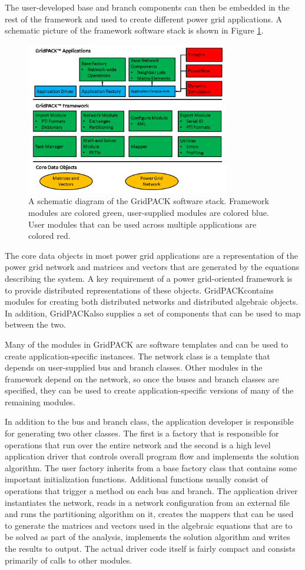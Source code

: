 \documentclass[preprint]{acm_proc_article-sp}
\begin{document}
The user-developed base and branch components can then be embedded in the rest
of the framework and used to create different power grid applications. A
schematic picture of the framework software stack is shown in Figure
\ref{schematic}.
\begin{figure}
\centering
\includegraphics[width=3.5in,keepaspectratio=true]{./Fig1}
\caption{\label{schematic} A schematic diagram of the GridPACK\texttrademark
software stack. Framework modules are colored green, user-supplied modules are
colored blue. User modules that can be used across multiple applications are
colored red.
}
\end{figure}
The core data objects in most power grid applications are a representation of
the power grid network and matrices and vectors that are generated by the
equations describing the system. A key requirement of a power grid-oriented
framework is to provide distributed representations of these objects.
GridPACK\texttrademark contains modules for creating both distributed networks
and distributed algebraic objects. In addition, GridPACK\texttrademark also
supplies a set of components that can be used to map between the two.

Many of the modules in GridPACK are software templates and can be used to create
application-specific instances. The network class is a template that depends
on user-supplied bus and branch classes. Other modules in the framework depend
on the network, so once the buses and branch classes are specified, they can be
used to create application-specific versions of many of the remaining modules.

In addition to the bus and branch class, the application developer is
responsible for generating two other classes. The first is a factory that
is responsible for operations that run over the entire network
and the second is a high
level application driver that controls overall program flow and implements the
solution algorithm. The user factory inherits from a base factory class that
contains some important initialization functions. Additional functions usually
consist of operations that
trigger a method on each bus and branch. The application driver instantiates the
network, reads in a network configuration from an external file and runs the
partitioning algorithm on it, creates the mappers that can be used to generate
the matrices and vectors used in the algebraic equations that are to be solved as
part of the analysis, implements the solution algorithm and writes the results
to output. The actual driver code itself is fairly compact and consists
primarily of calls to other modules.
\end{document}
